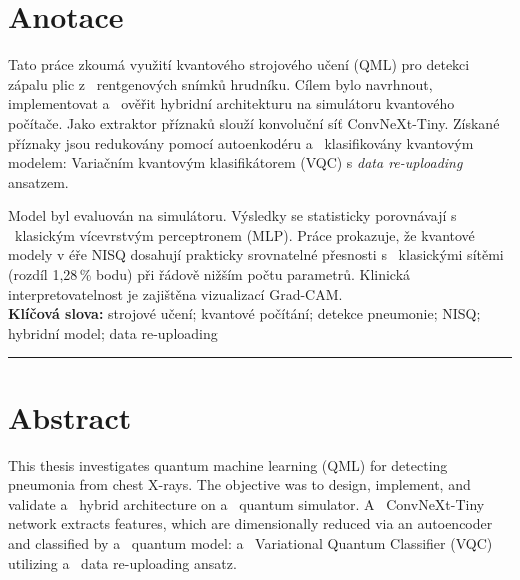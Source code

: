 \documentclass[12pt, a4paper]{report}
\begin{document}
\thispagestyle{empty}
%
%
\thispagestyle{empty}

\section*{Anotace}
Tato práce zkoumá využití kvantového strojového učení (QML) pro detekci zápalu plic z ~rentgenových snímků hrudníku. Cílem bylo navrhnout, implementovat a ~ověřit hybridní architekturu na simulátoru kvantového počítače. Jako extraktor příznaků slouží konvoluční síť ConvNeXt-Tiny. Získané příznaky jsou redukovány pomocí autoenkodéru a ~klasifikovány kvantovým modelem: Variačním kvantovým klasifikátorem (VQC) s \textit{data re-uploading} ansatzem.

Model byl evaluován na simulátoru. Výsledky se statisticky porovnávají s ~klasickým vícevrstvým perceptronem (MLP). Práce prokazuje, že kvantové modely v éře NISQ dosahují prakticky srovnatelné přesnosti s ~klasickými sítěmi (rozdíl 1{,}28\,\% bodu) při řádově nižším počtu parametrů. Klinická interpretovatelnost je zajištěna vizualizací Grad-CAM. \\

\textbf{Klíčová slova:} strojové učení; kvantové počítání; detekce pneumonie; NISQ; hybridní model; data re-uploading

\vspace{0.5cm}
\hrule
\vspace{0.5cm}

\section*{Abstract}
This thesis investigates quantum machine learning (QML) for detecting pneumonia from chest X-rays. The objective was to design, implement, and validate a ~hybrid architecture on a ~quantum simulator. A ~ConvNeXt-Tiny network extracts features, which are dimensionally reduced via an autoencoder and classified by a ~quantum model: a ~Variational Quantum Classifier (VQC) utilizing a ~data re-uploading ansatz.
\end{document}
